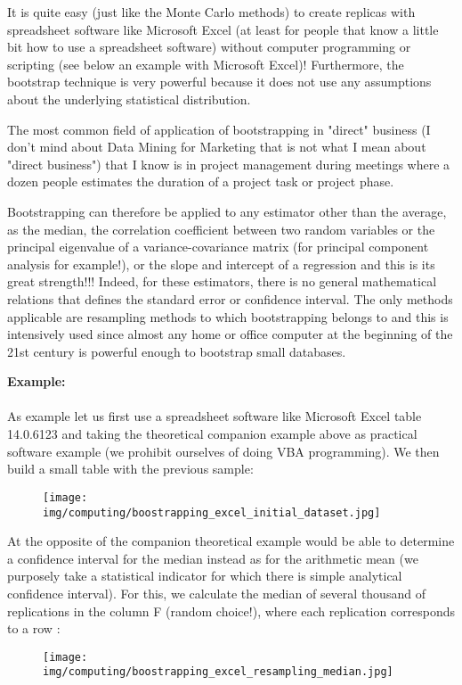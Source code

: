 	It is quite easy (just like the Monte Carlo methods) to create replicas with spreadsheet software like Microsoft Excel (at least for people that know a little bit how to use a spreadsheet software) without computer programming or scripting (see below an example with Microsoft Excel)! Furthermore, the bootstrap technique is very powerful because it does not use any assumptions about the underlying statistical distribution. 

	The most common field of application of bootstrapping in "direct" business (I don't mind about Data Mining for Marketing that is not what I mean about "direct business") that I know is in project management during meetings where a dozen people estimates the duration of a project task or project phase.
	
	Bootstrapping can therefore be applied to any estimator other than the average, as the median, the correlation coefficient between two random variables or the principal eigenvalue of a variance-covariance matrix (for principal component analysis for example!), or the slope and intercept of a regression and this is its great strength!!! Indeed, for these estimators, there is no general mathematical relations that defines the standard error or confidence interval. The only methods applicable are resampling methods to which bootstrapping belongs to and this is intensively used since almost any home or office computer at the beginning of the 21st century is powerful enough to bootstrap small databases.
	\begin{tcolorbox}[colframe=black,colback=white,sharp corners]
	\textbf{{\Large {}}Example:}\\\\
	As example let us first use a spreadsheet software like Microsoft Excel table 14.0.6123 and taking the theoretical companion example above as practical software example (we prohibit ourselves of doing VBA programming). We then build a small table with the previous sample:
	\begin{figure}[H]
		\centering
		\texttt{[image: img/computing/boostrapping\_excel\_initial\_dataset.jpg]}
	\end{figure}
	At the opposite of the companion theoretical example  would be able to determine a confidence interval for the median instead as for the arithmetic mean (we purposely take a statistical indicator for which there is simple analytical confidence interval). For this, we calculate the median of several thousand of replications in the column F (random choice!), where each replication corresponds to a row :
	\begin{figure}[H]
		\centering
		\texttt{[image: img/computing/boostrapping\_excel\_resampling\_median.jpg]}
	\end{figure}
	\end{tcolorbox}
	
